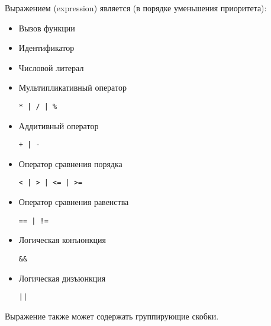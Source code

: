 Выражением (expression) является (в порядке уменьшения приоритета):
\begin{itemize}
    \item Вызов функции\\
    
    \item Идентификатор\\
    
    \item Числовой литерал\\
    
    \item Мультипликативный оператор
\begin{lstlisting}
* | / | %
\end{lstlisting}
    
    \item Аддитивный оператор
\begin{lstlisting}
+ | -
\end{lstlisting}
    
    \item Оператор сравнения порядка
\begin{lstlisting}
< | > | <= | >=
\end{lstlisting}
    
    \item Оператор сравнения равенства
\begin{lstlisting}
== | !=
\end{lstlisting}
    
    \item Логическая конъюнкция
\begin{lstlisting}
&&
\end{lstlisting}
    
    \item Логическая дизъюнкция
\begin{lstlisting}
||
\end{lstlisting}
\end{itemize}

Выражение также может содержать группирующие скобки.

